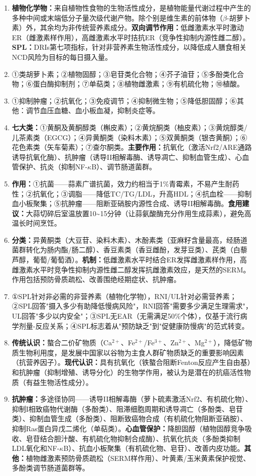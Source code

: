 {\begin{enumerate}[leftmargin=*, itemsep=5pt]
    \item \textbf{植物化学物：}来自植物性食物的生物活性成分，是植物能量代谢过程中产生的多种中间或末端低分子量次级代谢产物。除个别是维生素的前体物（$\beta$-胡萝卜素）外，其余均为非传统营养素成分。\textbf{双向调节作用：}低雌激素水平时激动ER（雌激素样作用），高雌激素水平时拮抗ER（竞争性抑制内源性雌二醇）。\textbf{SPL：}DRIs第七项指标，针对非营养素生物活性成分，以降低成人膳食相关NCD风险为目标的每日摄入量。
    \item ①类胡萝卜素；②植物固醇；③皂苷类化合物；④芥子油苷；⑤多酚类化合物；⑥蛋白酶抑制剂；⑦单萜类；⑧植物雌激素；⑨有机硫化物；⑩植酸。
    \item ①抑制肿瘤；②抗氧化；③免疫调节；④抑制微生物；⑤降低胆固醇；⑥其他：调节血压血糖、血小板血凝，抑制炎症等。
    \item \textbf{七大类：}①黄酮及黄酮醇类（槲皮素）；②黄烷酮类（柚皮素）；③黄烷醇类/儿茶素类（EGCG）；④异黄酮类（染料木素）；⑤双黄酮类（银杏黄酮）；⑥花色素类（矢车菊素）；⑦查尔酮类。\textbf{主要作用：}抗氧化（激活Nrf2/ARE通路诱导抗氧化酶）、抗肿瘤（诱导II相解毒酶、诱导凋亡、抑制血管生成）、心血管保护、抗炎（抑制NF-$\kappa$B）、调节肠道菌群。
    \item \textbf{作用：}①抗菌——蒜素广谱抗菌，效力约相当于1\%青霉素，不易产生耐药性；②抗氧化；③调脂——降低TC/TG/LDL，升高HDL；④抗血栓——抑制血小板聚集；⑤抗肿瘤——阻断亚硝胺内源性合成、诱导II相解毒酶。\textbf{食用建议：}大蒜切碎后室温放置10\~{}15分钟（让蒜氨酸酶充分作用生成蒜素），避免高温长时间烹饪。
    \item \textbf{分类：}异黄酮类（大豆苷、染料木素）、木酚素类（亚麻籽含量最高，经肠道菌群转化为肠内酯/肠二醇）、香豆素类（香豆雌酚，发芽豆类）、芪类（白藜芦醇，葡萄/葡萄酒）。\textbf{机制：}低雌激素水平时结合ER发挥雌激素样作用，高雌激素水平时竞争性抑制内源性雌二醇发挥抗雌激素效应，是天然的SERM。作用包括预防骨质疏松、改善围绝经期症状、抗肿瘤。
    \item ①SPL针对非必需的非营养素（植物化学物），RNI/UL针对必需营养素；②SPL回答"摄入多少有助降低慢病风险"，RNI回答"需要多少满足生理需求"，UL回答"多少以内安全"；③SPL无EAR（无需满足50\%个体），仅基于流行病学剂量-反应关系；④SPL标志着从"预防缺乏"到"促健康防慢病"的范式转变。
    \item \textbf{传统认识：}螯合二价矿物质（Ca$^{2+}$、Fe$^{2+}$/Fe$^{3+}$、Zn$^{2+}$、Mg$^{2+}$），降低矿物质生物利用度，是发展中国家以谷物为主食人群矿物质缺乏的重要影响因素（抗营养因子）。\textbf{现代认识：}具有抗氧化（铁螯合阻断Fenton反应产生自由基）和抗肿瘤（抑制增殖、诱导分化）的生物学作用，被认为是潜在的抗癌活性物质（有益生物活性成分）。
    \item \textbf{抗肿瘤：}多途径协同——诱导II相解毒酶（萝卜硫素激活Nrf2、有机硫化物）、抑制I相致癌物代谢酶（多酚类）、阻滞细胞周期和诱导凋亡（多酚类、皂苷类）、抑制血管生成（多酚类）、阻断致癌物合成（有机硫化物阻断亚硝胺）、抑制Ras蛋白异戊二烯化（单萜类）。\textbf{心血管保护：}降胆固醇（植物固醇竞争吸收、皂苷结合胆汁酸、有机硫化物抑制合成酶）、抗氧化抗炎（多酚类抑制LDL氧化和NF-$\kappa$B）、抗血小板聚集（有机硫化物、皂苷）、改善内皮功能。\textbf{其他：}植物雌激素预防骨质疏松（SERM样作用）、叶黄素/玉米黄素保护视觉、多酚类调节肠道菌群等。
\end{enumerate}

\newpage
}
